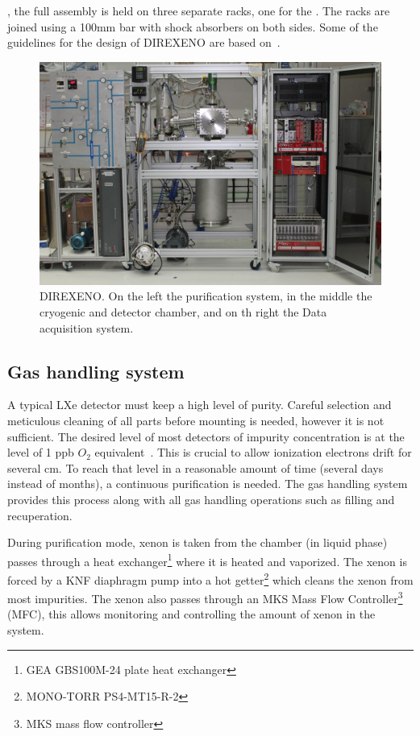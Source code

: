 , the full assembly is held on three separate racks, 
one for the . The racks are joined using a 100mm bar with shock 
absorbers on both sides. Some of the guidelines for the design of DIREXENO are based 
on~\cite{Giboni}.  

\begin{figure}[h]
\centerline{\includegraphics[width=0.8\linewidth]{FullDet.jpg}}
\caption{DIREXENO. On the left the purification system, in the middle the cryogenic and detector chamber, and on th right the Data acquisition system.}
\label{fig:fulldet}
\end{figure}

\subsection{Gas handling system}
\label{subsec:gas}

A typical LXe detector must keep a high level of purity. Careful selection and 
meticulous cleaning of all parts before mounting is needed, however it is not sufficient. 
The desired level of most detectors of impurity concentration is at the level of 1 ppb $O_2$ 
equivalent~\cite{Aprile:2009dv}. This is crucial to allow ionization electrons drift for several 
cm. To reach that level in a reasonable amount of time (several days instead of months), 
a continuous purification is needed. The gas handling system provides this process 
along with all gas handling operations such as filling and recuperation.

During purification mode, xenon is taken from the chamber (in liquid phase)
passes through a heat exchanger\footnote{GEA GBS100M-24 plate heat exchanger} 
where it is heated and vaporized. The xenon is forced 
by a KNF diaphragm pump into a hot getter\footnote{MONO-TORR
PS4-MT15-R-2} which cleans the xenon from most impurities. The xenon
also passes through an MKS Mass Flow Controller\footnote{MKS mass flow controller} (MFC), 
this allows monitoring and controlling the amount of xenon in the system. 

